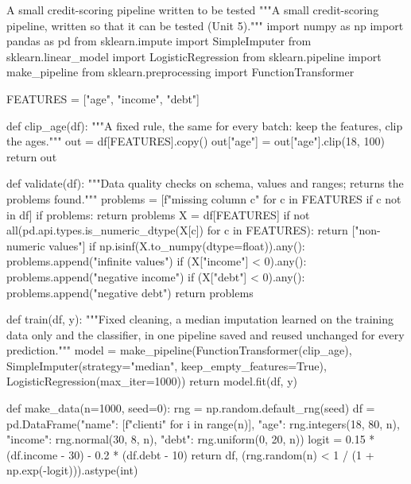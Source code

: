 \begin{pylisting}[label={lst:pipelinelib}]{A small credit-scoring pipeline written to be tested}
"""A small credit-scoring pipeline, written so that it can be tested (Unit 5)."""
import numpy as np
import pandas as pd
from sklearn.impute import SimpleImputer
from sklearn.linear_model import LogisticRegression
from sklearn.pipeline import make_pipeline
from sklearn.preprocessing import FunctionTransformer

FEATURES = ["age", "income", "debt"]

def clip_age(df):
    """A fixed rule, the same for every batch: keep the features, clip the ages."""
    out = df[FEATURES].copy()
    out["age"] = out["age"].clip(18, 100)
    return out

def validate(df):
    """Data quality checks on schema, values and ranges; returns the problems found."""
    problems = [f"missing column {c}" for c in FEATURES if c not in df]
    if problems:
        return problems
    X = df[FEATURES]
    if not all(pd.api.types.is_numeric_dtype(X[c]) for c in FEATURES):
        return ["non-numeric values"]
    if np.isinf(X.to_numpy(dtype=float)).any():
        problems.append("infinite values")
    if (X["income"] < 0).any():
        problems.append("negative income")
    if (X["debt"] < 0).any():
        problems.append("negative debt")
    return problems

def train(df, y):
    """Fixed cleaning, a median imputation learned on the training data only and the
    classifier, in one pipeline saved and reused unchanged for every prediction."""
    model = make_pipeline(FunctionTransformer(clip_age),
                          SimpleImputer(strategy="median", keep_empty_features=True),
                          LogisticRegression(max_iter=1000))
    return model.fit(df, y)

def make_data(n=1000, seed=0):
    rng = np.random.default_rng(seed)
    df = pd.DataFrame({"name": [f"client{i}" for i in range(n)],
                       "age": rng.integers(18, 80, n), "income": rng.normal(30, 8, n),
                       "debt": rng.uniform(0, 20, n)})
    logit = 0.15 * (df.income - 30) - 0.2 * (df.debt - 10)
    return df, (rng.random(n) < 1 / (1 + np.exp(-logit))).astype(int)
\end{pylisting}

